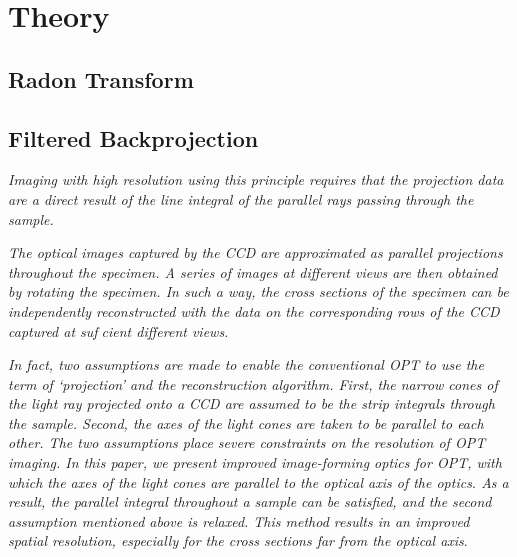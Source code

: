 \documentclass[12pt]{article}
\begin{document}
\section{Theory}
\label{sec:theory}

\subsection{Radon Transform}


\subsection{Filtered Backprojection}
\label{subsec:FBP}






 \textit{Imaging with high resolution using this principle requires that the projection data are a direct result of the line integral of   the   parallel   rays   passing   through   the   sample.
} \cite{Wang:2006hy}

\textit{The optical images captured by the CCD are approximated as parallel projections throughout
 the specimen. A series of images at different views are then obtained by rotating the specimen.
 In such a way, the cross sections of the specimen can be independently reconstructed with the
 data on the corresponding rows of the CCD captured at sufcient different views.}\cite{Wang:2006hy}

\textit{ In fact, two assumptions are made to enable the conventional OPT to use the term of ‘projection’ and the reconstruction algorithm. First, the narrow cones of the light ray projected onto a CCD are assumed to be the strip integrals through the sample. Second, the axes of the light cones are taken to be parallel to each other. The two assumptions place severe constraints on the resolution of OPT imaging. In this paper, we present improved image-forming optics for OPT, with which the axes of the light cones are parallel to the optical axis of the optics. As a result, the parallel integral throughout a sample can be satisfied, and the second assumption mentioned above is relaxed. This method results in an improved spatial resolution, especially for the cross sections far from the optical axis}. \cite{Wang:2006hy}
\end{document}
